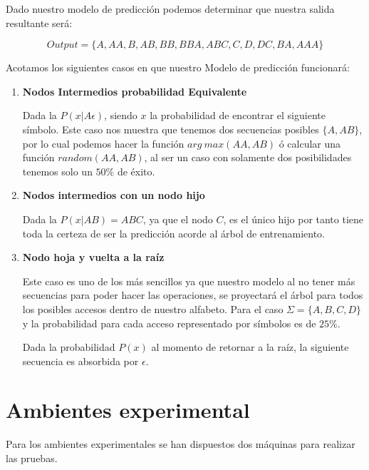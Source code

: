 Dado nuestro modelo de predicción podemos determinar que nuestra salida resultante será:

\begin{equation}
Output = \{ A,AA,B,AB,BB,BBA,ABC,C,D,DC,BA,AAA \}
\end{equation}


Acotamos los siguientes casos en que nuestro Modelo de predicción funcionará:


\begin{enumerate}
	\item \textbf{Nodos Intermedios probabilidad Equivalente}
	
	Dada la $P( x | A\epsilon  )$, siendo $x$ la probabilidad de encontrar el siguiente símbolo. Este caso nos muestra que tenemos dos secuencias posibles $\{A,AB\}$, por lo cual podemos hacer la función $arg\ max(AA,AB)$ ó calcular una función $random(AA,AB)$, al ser un caso con solamente dos posibilidades tenemos solo un $50\%$ de éxito.
	
	
	\item \textbf{Nodos intermedios con un nodo hijo }
	
	Dada la $P( x | AB  )  = ABC$, ya que  el nodo $C$, es el único hijo por tanto tiene toda la certeza de ser la predicción acorde al árbol de entrenamiento.
		
		
		
	\item \textbf{Nodo hoja y vuelta a la raíz}	
	
	Este caso es uno de los más sencillos ya que nuestro modelo al no tener más secuencias para poder hacer las operaciones, se proyectará el árbol para todos los posibles accesos dentro de nuestro alfabeto. Para el caso $\Sigma = \{A,B,C,D \} $ y la probabilidad para cada acceso representado por símbolos es de $25\%$.
	
	
	Dada la probabilidad $P( x ) $ al momento de retornar a la raíz, la siguiente secuencia es absorbida por $\epsilon$.
	

\end{enumerate}







\section{Ambientes experimental}

Para los ambientes experimentales se han dispuestos dos máquinas para realizar las pruebas. 

